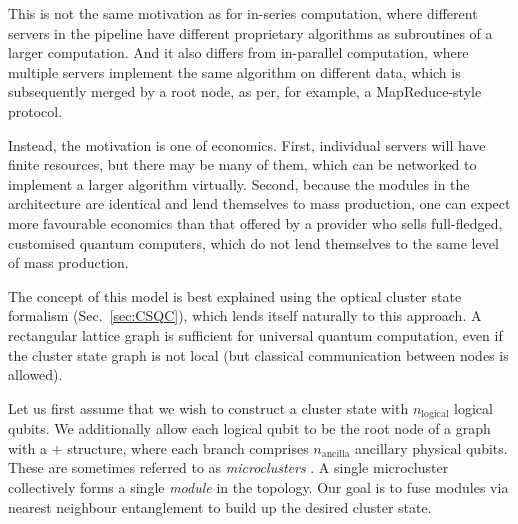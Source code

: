 \documentclass[aps,rmp,twocolumn,amsmath,amssymb,nofootinbib,superscriptaddress,longbibliography,floatfix]{revtex4-1}
\begin{document}
This is not the same motivation as for in-series computation, where different servers in the pipeline have different proprietary algorithms as subroutines of a larger computation. And it also differs from in-parallel computation, where multiple servers implement the same algorithm on different data, which is subsequently merged by a root node, as per, for example, a {\sc MapReduce}-style protocol.

Instead, the motivation is one of economics. First, individual servers will have finite resources, but there may be many of them, which can be networked to implement a larger algorithm virtually. Second, because the modules in the architecture are identical and lend themselves to mass production, one can expect more favourable economics than that offered by a provider who sells full-fledged, customised quantum computers, which do not lend themselves to the same level of mass production.

The concept of this model is best explained using the optical cluster state formalism (Sec.~\ref{sec:CSQC}), which lends itself naturally to this approach. A rectangular lattice graph is sufficient for universal quantum computation, even if the cluster state graph is not local (but classical communication between nodes is allowed).

Let us first assume that we wish to construct a cluster state with $n_\mathrm{logical}$ logical qubits. We additionally allow each logical qubit to be the root node of a graph with a $+$ structure, where each branch comprises $n_\mathrm{ancilla}$ ancillary physical qubits. These are sometimes referred to as \emph{microclusters} \cite{bib:Nielsen04}. A single microcluster collectively forms a single \emph{module} in the topology. Our goal is to fuse modules via nearest neighbour entanglement to build up the desired cluster state.
\end{document}
